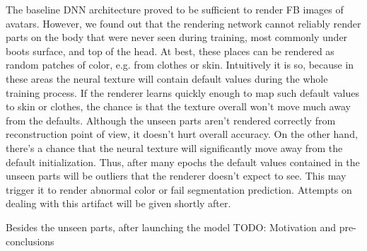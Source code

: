 The baseline DNN architecture \cite{dnn:stylepeople21} proved to be sufficient to render FB images of avatars. However, we found out that the rendering network cannot reliably render parts on the body that were never seen during training, most commonly under boots surface, and top of the head. At best, these places can be rendered as random patches of color, e.g. from clothes or skin. Intuitively it is so, because in these areas the neural texture will contain default values during the whole training process. If the renderer learns quickly enough to map such default values to skin or clothes, the chance is that the texture overall won't move much away from the defaults. Although the unseen parts aren't rendered correctly from reconstruction point of view, it doesn't hurt overall accuracy. On the other hand, there's a chance that the neural texture will significantly move away from the default initialization. Thus, after many epochs the default values contained in the unseen parts will be outliers that the renderer doesn't expect to see. This may trigger it to render abnormal color or fail segmentation prediction. Attempts on dealing with this artifact will be given shortly after.

Besides the unseen parts, after launching the model
\alert{TODO: Motivation and pre-conclusions}

